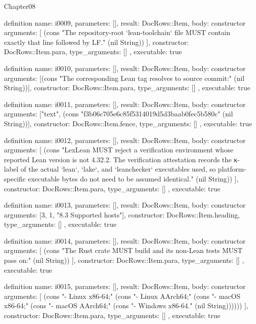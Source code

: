 \begin{lexlean}{Chapter08}
\begin{semanticmodule}
definition{
  name: i0009,
  parameters: [],
  result: DocRows::Item,
  body: constructor{
    arguments: [
      (cons "The repository-root `lean-toolchain` file MUST contain exactly that line followed by LF." (nil String))
    ],
    constructor: DocRows::Item.para,
    type_arguments: []
  },
  executable: true
}

definition{
  name: i0010,
  parameters: [],
  result: DocRows::Item,
  body: constructor{
    arguments: [(cons "The corresponding Lean tag resolves to source commit:" (nil String))],
    constructor: DocRows::Item.para,
    type_arguments: []
  },
  executable: true
}

definition{
  name: i0011,
  parameters: [],
  result: DocRows::Item,
  body: constructor{
    arguments: ["text", (cons "f3b06c705e6c85f5314019d5d3baab0fec5b580c" (nil String))],
    constructor: DocRows::Item.fence,
    type_arguments: []
  },
  executable: true
}

definition{
  name: i0012,
  parameters: [],
  result: DocRows::Item,
  body: constructor{
    arguments: [
      (cons "LexLean MUST reject a verification environment whose reported Lean version is not 4.32.2. The verification attestation records the κ-label of the actual `lean`, `lake`, and `leanchecker` executables used, so platform-specific executable bytes do not need to be assumed identical." (nil String))
    ],
    constructor: DocRows::Item.para,
    type_arguments: []
  },
  executable: true
}

definition{
  name: i0013,
  parameters: [],
  result: DocRows::Item,
  body: constructor{
    arguments: [3, 1, "8.3 Supported hosts"],
    constructor: DocRows::Item.heading,
    type_arguments: []
  },
  executable: true
}

definition{
  name: i0014,
  parameters: [],
  result: DocRows::Item,
  body: constructor{
    arguments: [
      (cons "The Rust crate MUST build and its non-Lean tests MUST pass on:" (nil String))
    ],
    constructor: DocRows::Item.para,
    type_arguments: []
  },
  executable: true
}

definition{
  name: i0015,
  parameters: [],
  result: DocRows::Item,
  body: constructor{
    arguments: [
      (cons "- Linux x86-64;" (cons "- Linux AArch64;" (cons "- macOS x86-64;" (cons "- macOS AArch64;" (cons "- Windows x86-64." (nil String))))))
    ],
    constructor: DocRows::Item.para,
    type_arguments: []
  },
  executable: true
}


\end{semanticmodule}
\end{lexlean}
